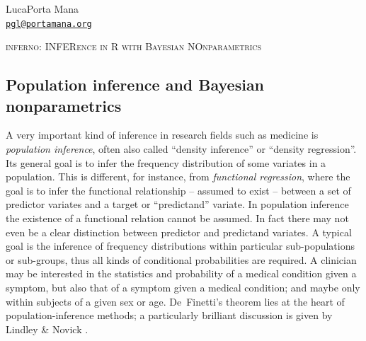 

\newcommand{\citebi}{\cite}
\newcommand{\citein}{\cite}
\newcommand*{\subtitleproc}[1]{}
\newcommand*{\chapb}{}
\providecommand{\doi}[1]{}
\renewcommand{\doi}[1]{\href{https://doi.org/#1}{doi:#1}}
\newcommand*{\osfdoi}[1]{Open Science Framework \doi{#1}}
\newcommand*{\amp}{\&}
\renewcommand*{\P}{\mathrm{P}}%
\renewcommand*{\|}[1][]{\nonscript\:#1\vert\nonscript\:\mathopen{}}
\newcommand*{\mo}[1][=]{\mathclose{}\mathord{\nonscript\mkern0.5mu#1\nonscript\mkern0.5mu}\mathopen{}}
\newcommand*{\yF}{F}
\newcommand*{\yf}{f}
\newcommand*{\di}{\mathop{}\!\mathrm{d}}
\newcommand*{\HV}{\mathit{HV}}
\newcommand*{\GDS}{\mathit{GDS}}
\newcommand*{\cAD}{\mathit{cAD}}
\newcommand*{\yy}{\mathrm{Y}}
\newcommand*{\yn}{\mathrm{N}}


\begin{center}
{\large Luca\enspace Porta Mana} \\
{\tt \href{mailto:pgl@portamana.org}{pgl@portamana.org}}


\Large
\textsc{inferno: INFERence in R with Bayesian NOnparametrics}
\end{center}

\subsection*{Population inference and Bayesian nonparametrics}
\label{sec:popinference}

A very important kind of inference in research fields such as medicine is \emph{population inference}, often also called ``density inference'' or ``density regression''. Its general goal is to infer the frequency distribution of some variates in a population. This is different, for instance, from \emph{functional regression}, where the goal is to infer the functional relationship -- assumed to exist -- between a set of predictor variates and a target or ``predictand'' variate. In population inference the existence of a functional relation cannot be assumed. In fact there may not even be a clear distinction between predictor and predictand variates. A typical goal is the inference of frequency distributions within particular sub-populations or sub-groups, thus all kinds of conditional probabilities are required. A clinician may be interested in the statistics and probability of a medical condition given a symptom, but also that of a symptom given a medical condition; and maybe only within subjects of a given sex or age. De~Finetti's theorem \citep[see e.g.][\S\S\,4.2, 4.3, 4.6]{bernardoetal1994_r2000} lies at the heart of population-inference methods; a particularly brilliant discussion is given by Lindley \& Novick \citeyearpar{lindleyetal1981}.

